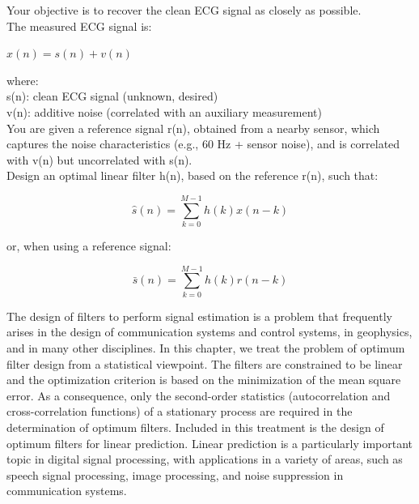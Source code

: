 \documentclass{article}
\begin{document}
Your objective is to recover the clean ECG signal as closely as possible. \\
\vspace{1em}
The measured ECG signal is:
\begin{center}
$x(n) = s(n) + v(n)$
\end{center}
where: \\
s(n): clean ECG signal (unknown, desired) \\
\vspace{1em}
v(n): additive noise (correlated with an auxiliary measurement) \\
\vspace{1em}
You are given a reference signal r(n), obtained from a nearby sensor, which captures the noise characteristics (e.g., 60 Hz + sensor noise), and is correlated with v(n) but uncorrelated with s(n). \\
\vspace{1em}
Design an optimal linear filter h(n), based on the reference r(n), such that: \\
\begin{center}
$$\hat{s}(n)=\sum_{k=0}^{M-1}h(k)x(n-k)$$
\end{center}
or, when using a reference signal:
\begin{center}
$$\bar{s}(n)=\sum_{k=0}^{M-1}h(k)r(n-k)$$
\end{center}
The design of filters to perform signal estimation is a problem that
frequently arises in the design of communication systems and control
systems, in geophysics, and in many other disciplines. In this chapter, we
treat the problem of optimum filter design from a statistical viewpoint.
The filters are constrained to be linear and the optimization criterion is
based on the minimization of the mean square error. As a consequence,
only the second-order statistics (autocorrelation and cross-correlation
functions) of a stationary process are required in the determination of
optimum filters.
Included in this treatment is the design of optimum filters for linear
prediction. Linear prediction is a particularly important topic in digital
signal processing, with applications in a variety of areas, such as speech
signal processing, image processing, and noise suppression in communication systems. 
\end{document}
